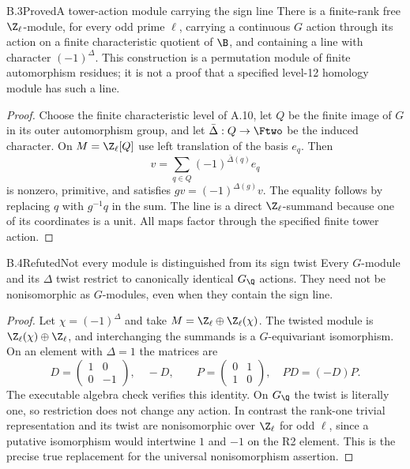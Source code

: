 \begin{statement}{B.3}{Proved}{A tower-action module carrying the sign line}
There is a finite-rank free $\Z_\ell$-module, for every odd
prime $\ell$, carrying a continuous $G$ action through its
action on a finite characteristic quotient of $\B$, and
containing a line with character $(-1)^\Delta$.
This construction is a permutation module of finite
automorphism residues; it is not a proof that a specified
level-12 homology module has such a line.
\end{statement}
\begin{proof}
Choose the finite characteristic level of A.10, let $Q$
be the finite image of $G$ in its outer automorphism group,
and let $\bar\Delta:Q\to\Ftwo$ be the induced character.
On $M=\Z_\ell[Q]$ use left translation of the basis $e_q$.
Then
\[
 v=\sum_{q\in Q}(-1)^{\bar\Delta(q)}e_q
\]
is nonzero, primitive, and satisfies
$g v=(-1)^{\Delta(g)}v$. The equality follows by replacing
$q$ with $g^{-1}q$ in the sum. The line is a direct
$\Z_\ell$-summand because one of its coordinates is a unit.
All maps factor through the specified finite tower action.
\end{proof}

\begin{statement}{B.4}{Refuted}{Not every module is distinguished from its sign twist}
Every $G$-module and its $\Delta$ twist restrict to canonically
identical $G_{\Q}$ actions. They need not be nonisomorphic
as $G$-modules, even when they contain the sign line.
\end{statement}
\begin{proof}
Let $\chi=(-1)^\Delta$ and take
$M=\Z_\ell\oplus\Z_\ell(\chi)$. The twisted module is
$\Z_\ell(\chi)\oplus\Z_\ell$, and interchanging the
summands is a $G$-equivariant isomorphism. On an element
with $\Delta=1$ the matrices are
\[
 D=\begin{pmatrix}1&0\\0&-1\end{pmatrix},\quad
 -D,\qquad
 P=\begin{pmatrix}0&1\\1&0\end{pmatrix},\quad PD=(-D)P.
\]
The executable algebra check verifies this identity.
On $G_{\Q}$ the twist is literally one, so restriction
does not change any action. In contrast the rank-one
trivial representation and its twist are nonisomorphic
over $\Z_\ell$ for odd $\ell$, since a putative
isomorphism would intertwine $1$ and $-1$ on the R2
element. This is the precise true replacement for the
universal nonisomorphism assertion.
\end{proof}

